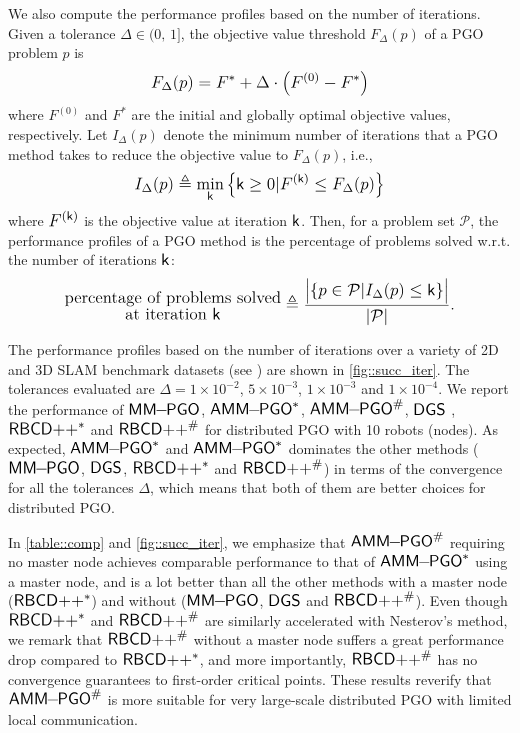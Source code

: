 We also compute the performance profiles \cite{dolan2002benchmarking} based on the number of iterations. Given a  tolerance $\Delta\in(0,\,1]$, the objective value threshold $F_{\Delta}(p)$ of a PGO problem $p$
is 
\vspace{-0.15em}
\begin{equation}\label{eq::Fdel}
F_{\Delta}(p) = F^* + \Delta\cdot\big(F^{(0)}-F^*\big)
\vspace{-0.15em}
\end{equation}
where  $F^{(0)}$ and $F^*$ are the initial and globally optimal objective values, respectively. Let $I_{\Delta}(p)$ denote the minimum number of iterations that  a PGO method takes to reduce the objective value to $F_\Delta(p)$, i.e.,
\vspace{-0.15em}
\begin{equation}
\nonumber
I_{\Delta}(p)\triangleq\min_{\sk}\big\{\sk\geq 0| F^{(\sk)}\leq F_{\Delta}(p)\big\}
\vspace{-0.15em}
\end{equation}
where $F^{(\sk)}$ is the objective value at iteration $\sk$. Then, for a problem set $\mathcal{P}$, the performance profiles of a PGO method is the percentage of problems solved w.r.t. the number of iterations $\sk$:
\vspace{-0.25em}
\begin{equation}
\nonumber
\substack{\text{\normalsize percentage of problems solved}\\ \text{\normalsize at iteration $\sk$}} \triangleq \frac{\big|\{p\in\mathcal{P}|I_{\Delta}(p)\leq \sk\}\big|}{|\mathcal{P}|}.
\end{equation}

The performance profiles based on the number of iterations over a variety of 2D and 3D SLAM benchmark datasets (see \datasetinfo) are shown in \cref{fig::succ_iter}. The tolerances evaluated are $\Delta=1\times10^{-2}$, $5\times10^{-3}$, $1\times10^{-3}$ and $1\times10^{-4}$. We report the performance of $\mm$, $\ammc$, $\ammd$, $\dgs$ \cite{choudhary2017distributed}, $\rbcdc$ \cite{tian2019distributed} and $\rbcdd$ \cite{tian2019distributed} for distributed PGO with 10 robots (nodes). As expected, $\ammc$ and $\ammc$ dominates the other methods ($\mm$, $\dgs$, $\rbcdc$ and $\rbcdd$) in terms of the convergence for all the tolerances $\Delta$, which means that  both of them are better choices for distributed PGO. 


In \cref{table::comp} and \cref{fig::succ_iter}, we emphasize that $\ammd$ requiring no master node achieves comparable performance to that of $\ammc$ using a master node, and is a lot better than all the other methods with a master node ($\rbcdc$) and without ($\mm$, $\dgs$ and $\rbcdd$). Even though $\rbcdc$ and $\rbcdd$ are similarly accelerated with Nesterov's method, we remark that $\rbcdd$ without a master node suffers a great performance drop compared to $\rbcdc$, and more importantly, $\rbcdd$ has no convergence guarantees to first-order critical points. These results reverify that $\ammd$ is more suitable for very large-scale distributed PGO with limited local communication. 

